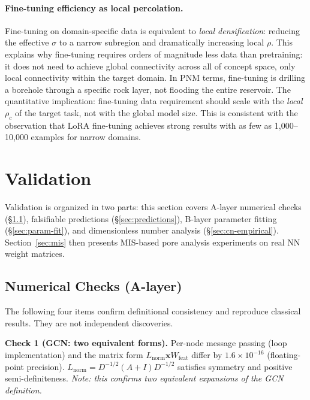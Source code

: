 \documentclass[11pt,a4paper]{article}
\newcommand{\Lnorm}{L_{\text{norm}}}
\begin{document}
\paragraph{Fine-tuning efficiency as local percolation.}
Fine-tuning on domain-specific data is equivalent to \emph{local densification}:
reducing the effective $\sigma$ to a narrow subregion and dramatically increasing
local $\rho$.
This explains why fine-tuning requires orders of magnitude less data than
pretraining: it does not need to achieve global connectivity across all of
concept space, only local connectivity within the target domain.
In PNM terms, fine-tuning is drilling a borehole through a specific rock
layer, not flooding the entire reservoir.
The quantitative implication: fine-tuning data requirement should scale with
the \emph{local} $\rho_c$ of the target task, not with the global model size.
This is consistent with the observation that LoRA fine-tuning achieves
strong results with as few as 1,000--10,000 examples for narrow domains.

\section{Validation}

Validation is organized in two parts: this section covers A-layer numerical
checks (\S\ref{sec:a-checks}), falsifiable predictions (\S\ref{sec:predictions}),
B-layer parameter fitting (\S\ref{sec:param-fit}), and dimensionless number
analysis (\S\ref{sec:cn-empirical}). Section~\ref{sec:mis} then presents
MIS-based pore analysis experiments on real NN weight matrices.

\subsection{Numerical Checks (A-layer)}
\label{sec:a-checks}

The following four items confirm definitional consistency and reproduce classical results. They are not independent discoveries.

\textbf{Check 1 (GCN: two equivalent forms).}
Per-node message passing (loop implementation) and the matrix form $\Lnorm\mathbf{x}W_{\text{feat}}$ differ by $1.6\times10^{-16}$ (floating-point precision). $\Lnorm = D^{-1/2}(A+I)D^{-1/2}$ satisfies symmetry and positive semi-definiteness. \emph{Note: this confirms two equivalent expansions of the \citet{kipf2017gcn} GCN definition.}
\end{document}
